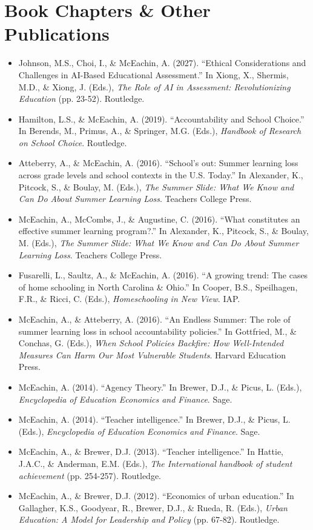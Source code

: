 \documentclass[11pt, letterpaper]{article}
\begin{document}
\section{Book Chapters \& Other Publications}
\begin{itemize}
  \item Johnson, M.S., Choi, I., \& McEachin, A. (2027).
  ``Ethical Considerations and Challenges in AI-Based Educational Assessment.''
In Xiong, X., Shermis, M.D., \& Xiong, J. (Eds.), \textit{The Role of AI in Assessment: Revolutionizing Education} (pp. 23-52). Routledge. 
  \item Hamilton, L.S., \& McEachin, A. (2019).
  ``Accountability and School Choice.''
In Berends, M., Primus, A., \& Springer, M.G. (Eds.), \textit{Handbook of Research on School Choice}. Routledge. 
  \item Atteberry, A., \& McEachin, A. (2016).
  ``School's out: Summer learning loss across grade levels and school contexts in the U.S. Today.''
In Alexander, K., Pitcock, S., \& Boulay, M. (Eds.), \textit{The Summer Slide: What We Know and Can Do About Summer Learning Loss}. Teachers College Press. 
  \item McEachin, A., McCombs, J., \& Augustine, C. (2016).
  ``What constitutes an effective summer learning program?.''
In Alexander, K., Pitcock, S., \& Boulay, M. (Eds.), \textit{The Summer Slide: What We Know and Can Do About Summer Learning Loss}. Teachers College Press. 
  \item Fusarelli, L., Saultz, A., \& McEachin, A. (2016).
  ``A growing trend: The cases of home schooling in North Carolina \& Ohio.''
In Cooper, B.S., Speilhagen, F.R., \& Ricci, C. (Eds.), \textit{Homeschooling in New View}. IAP. 
  \item McEachin, A., \& Atteberry, A. (2016).
  ``An Endless Summer: The role of summer learning loss in school accountability policies.''
In Gottfried, M., \& Conchas, G. (Eds.), \textit{When School Policies Backfire: How Well-Intended Measures Can Harm Our Most Vulnerable Students}. Harvard Education Press. 
  \item McEachin, A. (2014).
  ``Agency Theory.''
In Brewer, D.J., \& Picus, L. (Eds.), \textit{Encyclopedia of Education Economics and Finance}. Sage. 
  \item McEachin, A. (2014).
  ``Teacher intelligence.''
In Brewer, D.J., \& Picus, L. (Eds.), \textit{Encyclopedia of Education Economics and Finance}. Sage. 
  \item McEachin, A., \& Brewer, D.J. (2013).
  ``Teacher intelligence.''
In Hattie, J.A.C., \& Anderman, E.M. (Eds.), \textit{The International handbook of student achievement} (pp. 254-257). Routledge. 
  \item McEachin, A., \& Brewer, D.J. (2012).
  ``Economics of urban education.''
In Gallagher, K.S., Goodyear, R., Brewer, D.J., \& Rueda, R. (Eds.), \textit{Urban Education: A Model for Leadership and Policy} (pp. 67-82). Routledge. 
\end{itemize}
\end{document}
